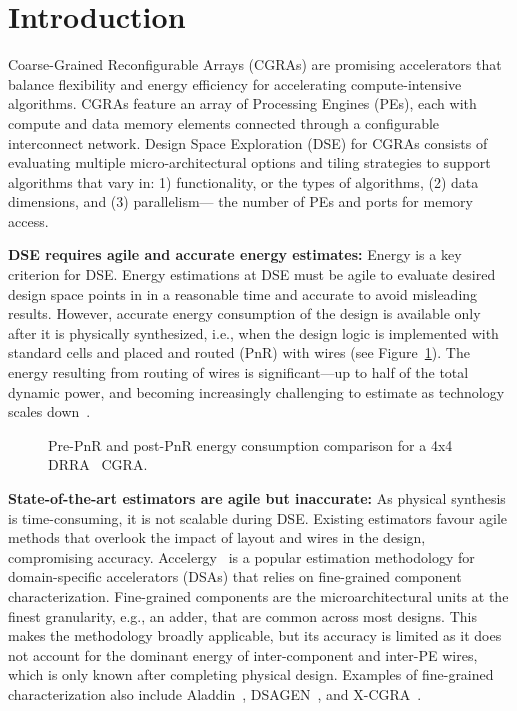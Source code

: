 \section{Introduction} \label{sec:intro}
Coarse-Grained Reconfigurable Arrays (CGRAs) are promising accelerators that balance flexibility and energy efficiency for accelerating compute-intensive algorithms. 
CGRAs feature an array of Processing Engines (PEs), each with compute and data memory elements connected through a configurable interconnect network.
Design Space Exploration (DSE) for CGRAs consists of evaluating multiple micro-architectural options and tiling strategies to support algorithms that vary in: 1) functionality, or the types of algorithms, (2) data dimensions, and (3) parallelism— the number of PEs and ports for memory access.
 
\textbf{DSE requires agile and accurate energy estimates:} Energy is a key criterion for DSE. 
Energy estimations at DSE must be agile to evaluate desired design space points in in a reasonable time and accurate to avoid misleading results.
However, accurate energy consumption of the design is available only after it is physically synthesized, i.e., when the design logic is implemented with standard cells and placed and routed (PnR) with wires (see Figure~\ref{fig:intro}).
The energy resulting from routing of wires is significant—up to half of the total dynamic power, and becoming increasingly challenging to estimate as technology scales down~\cite{shi2024post,huang2023comprehensive,xie2021net2,chan2017routability}.
\begin{figure}[t]
    \centering
    \scriptsize

\caption{\small Pre-PnR and post-PnR energy consumption comparison for a 4x4 DRRA~\cite{hemani2017synchoricity,pudi2024application} CGRA.}
\vspace{-6.5mm}
\label{fig:intro}
\end{figure}

\textbf{State-of-the-art estimators are agile but inaccurate:} As physical synthesis is time-consuming, it is not scalable during DSE.
Existing estimators favour agile methods that overlook the impact of layout and wires in the design, compromising accuracy.
Accelergy~\cite{wu2019accelergy} is a popular estimation methodology for domain-specific accelerators (DSAs) that relies on fine-grained component characterization.
Fine-grained components are the microarchitectural units at the finest granularity, e.g., an adder, that are common across most designs. 
This makes the methodology broadly applicable, but its accuracy is limited as it does not account for the dominant energy of inter-component and inter-PE wires, which is only known after completing physical design.
Examples of fine-grained characterization also include Aladdin~\cite{shao2014aladdin}, DSAGEN~\cite{weng2020dsagen}, and X-CGRA~\cite{akbari2019x}.

